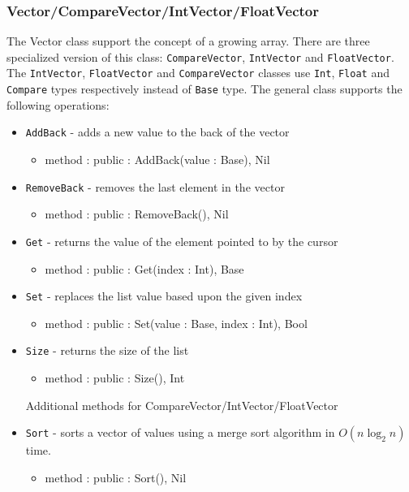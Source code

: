 \documentclass[12pt]{article}
\begin{document}
\subsubsection{Vector/CompareVector/IntVector/FloatVector}
The Vector class support the concept of a growing array.  There are three specialized version of this class: \texttt{CompareVector}, \texttt{IntVector} and \texttt{FloatVector}.  The \texttt{IntVector}, \texttt{FloatVector} and \texttt{CompareVector} classes use \texttt{Int}, \texttt{Float} and \texttt{Compare} types respectively instead of \texttt{Base} type.  The general class supports the following operations:
\begin{itemize}
    \item \texttt{AddBack} - adds a new value to the back of the vector
    	\begin{itemize}
	\item method : public : AddBack(value : Base), Nil
	\end{itemize}
    \item \texttt{RemoveBack} - removes the last element in the vector
    	\begin{itemize}
	\item method : public : RemoveBack(), Nil
	\end{itemize}
    \item \texttt{Get} - returns the value of the element  pointed to by the cursor
    	\begin{itemize}
	\item method : public : Get(index : Int), Base
	\end{itemize}
    \item \texttt{Set} - replaces the list value based upon the given index
    	\begin{itemize}
	\item method : public : Set(value : Base, index : Int), Bool
	\end{itemize}
    \item \texttt{Size} - returns the size of the list
    	\begin{itemize}
	\item method : public : Size(), Int
	\end{itemize}
Additional methods for CompareVector/IntVector/FloatVector
    \item \texttt{Sort} - sorts a vector of values using a merge sort algorithm in $O(n \log_2 n)$ time.
    	\begin{itemize}
	\item method : public : Sort(), Nil

\end{itemize}
\end{itemize}
\end{document}
